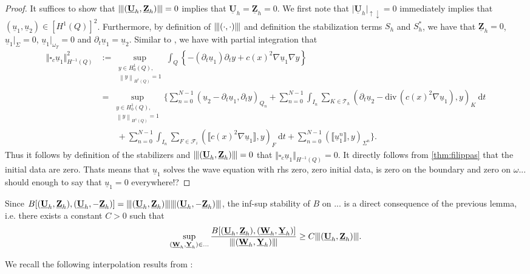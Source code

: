 \documentclass[10pt,reqno]{amsart}
\numberwithin{equation}{section}
\newcommand{\jump}[1]{\llbracket#1\rrbracket}
\renewcommand{\div}{\mathrm{div}\,}  %
\newcommand{\wop}{\square_c}
\newcommand{\tnorm}[1]{\vert\hspace{-0.3mm}\Vert#1\Vert\hspace{-0.3mm}\vert}
\providecommand{\norm}[1]{\left\lVert#1\right\rVert}
\providecommand{\norm}[1]{\left\lVert#1\right\rVert}
\newcommand{\dT}{\mathrm{d}t}
\newcommand{\Uh}{\underline{\mathbf{U}}_h}
\newcommand{\Yh}{\underline{\mathbf{Y}}_h}
\newcommand{\Zh}{\underline{\mathbf{Z}}_h}
\newcommand{\Wh}{\underline{\mathbf{W}}_h}
\newcommand{\ul}{\underline{u}}
\newcommand{\dt}{\partial_t}
\begin{document}
\begin{proof}
    It suffices to show that $\tnorm{(\Uh,\Zh)} = 0$ implies that $\Uh=\Zh= 0$. We first note that $\vert \Uh \vert_{\uparrow \downarrow} = 0$ immediately implies that $(\ul_1,\ul_2) \in [H^1(Q)]^2$. Furthermore, by definition of $\tnorm{(\cdot,\cdot)}$ and definition the stabilization terms $S_h$ and $S_h^{\ast}$, we have that $\Zh = 0$, $\ul_1 \vert_{\Sigma} = 0$, $\ul_1 \vert_{\omega_T} = 0$ and $\dt \ul_1 = \ul_2$. Similar to \cite[Lem. 2.1]{BP24}, we have with partial integration that 
    \begin{align*}
        \Vert \wop \ul_1 \Vert^2_{H^{-1}(Q)} &:= \sup_{\substack{  y \in H^1_0(Q), \\ \norm{y}_{H^1(Q) } = 1  }} \int_{Q} \left\{ -(\dt \ul_1) \dt y + c(x)^2 \nabla \ul_1 \nabla y \right\}  \\
        &= \sup_{\substack{  y \in H^1_0(Q), \\ \norm{y}_{H^1(Q) } = 1  }} \Big\{ \sum_{n = 0}^{N-1} (\ul_2 - \dt \ul_1, \dt y)_{Q_n} + \sum_{n = 0}^{N-1} \int_{I_n} \sum_{K \in \mathcal{T}_h} (\dt \ul_2 - \div(c(x)^2 \nabla \ul_1),y)_{K} \ \dT \\
        &\qquad + \sum_{n = 0}^{N-1} \int_{I_n} \sum_{F \in \mathcal{F}_i} (\jump{c(x)^2 \nabla \ul_1}, y)_F \ \dT + \sum_{n = 0}^{N-1} (\jump{\ul_1^n},y)_{\Sigma^n} \Big\}.
    \end{align*}
    Thus it follows by definition of the stabilizers and $\tnorm{(\Uh,\Zh)} = 0$ that $\Vert \wop \ul_1 \Vert_{H^{-1}(Q)} = 0$. It directly follows from \ref{thm:filippas} that the initial data are zero. {\color{gray} Thats means that $\ul_1$ solves the wave equation with rhs zero, zero initial data, is zero on the boundary and zero on $\omega$... should enough to say that $\ul_1 = 0$ everywhere!?}
\end{proof}

\noindent Since $B[(\Uh,\Zh),(\Uh,-\Zh)] = \tnorm{(\Uh,\Zh)}\tnorm{(\Uh,-\Zh)}$, the inf-sup stability of $B$ on ... is a direct consequence of the previous lemma, i.e. there exists a constant $C>0$ such that 
\begin{equation}
    \sup_{(\Wh,\Yh) \in ...} \frac{B[(\Uh,\Zh),(\Wh,\Yh)]}{\tnorm{(\Wh,\Yh)}} \ge C \tnorm{(\Uh,\Zh)}.
\end{equation}


We recall the following interpolation results from \cite{BP24}: 
\end{document}
